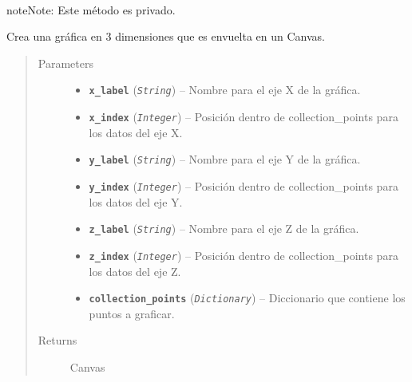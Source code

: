 \documentclass[letterpaper,10pt,english]{sphinxmanual}
\begin{document}
\begin{fulllineitems}
\begin{fulllineitems}
\end{fulllineitems}


\begin{fulllineitems}
\label{View/Additional/ResultsGrapher/GraphFrame:View.Additional.ResultsGrapher.GraphFrame.GraphFrame._GraphFrame__create_3d_canvas}~
\begin{notice}{note}{Note:}
Este método es privado.
\end{notice}

Crea una gráfica en 3 dimensiones que es envuelta en un Canvas.
\begin{quote}\begin{description}
\item[{Parameters}] \leavevmode\begin{itemize}
\item {} 
\textbf{\texttt{x\_label}} (\emph{\texttt{String}}) -- Nombre para el eje X de la gráfica.

\item {} 
\textbf{\texttt{x\_index}} (\emph{\texttt{Integer}}) -- Posición dentro de collection\_points para los datos del eje X.

\item {} 
\textbf{\texttt{y\_label}} (\emph{\texttt{String}}) -- Nombre para el eje Y de la gráfica.

\item {} 
\textbf{\texttt{y\_index}} (\emph{\texttt{Integer}}) -- Posición dentro de collection\_points para los datos del eje Y.

\item {} 
\textbf{\texttt{z\_label}} (\emph{\texttt{String}}) -- Nombre para el eje Z de la gráfica.

\item {} 
\textbf{\texttt{z\_index}} (\emph{\texttt{Integer}}) -- Posición dentro de collection\_points para los datos del eje Z.

\item {} 
\textbf{\texttt{collection\_points}} (\emph{\texttt{Dictionary}}) -- Diccionario que contiene los puntos a graficar.

\end{itemize}

\item[{Returns}] \leavevmode
Canvas


\end{description}
\end{quote}
\end{fulllineitems}
\end{fulllineitems}
\end{document}
